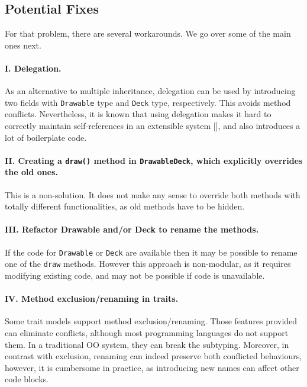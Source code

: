 \subsection{Potential Fixes}

For that problem, there are several workarounds. We go over some of
the main ones next.

\paragraph{I. Delegation.} As an alternative to multiple inheritance,
delegation can be used by introducing two fields with
\lstinline|Drawable| type and \lstinline|Deck| type,
respectively. This avoids method conflicts. Nevertheless, it is known
that using delegation makes it hard to correctly maintain
self-references  in an extensible system [], and also
introduces a lot of boilerplate code.

\paragraph{II. Creating a \lstinline|draw()| method in \lstinline|DrawableDeck|, which explicitly overrides the old ones.}
This is a non-solution. It does not make any sense to override both methods with totally different functionalities, as old
methods have to be hidden.

\paragraph{III. Refactor Drawable and/or Deck to rename the methods.} If
the code for \lstinline|Drawable| or \lstinline|Deck| are available
then it may be possible to rename one of the \lstinline|draw|
methods. However this approach is non-modular, as it requires 
modifying existing code, and may not be possible if code is unavailable.


\paragraph{IV. Method exclusion/renaming in traits.} Some trait models
support method exclusion/renaming. Those features
provided can eliminate conflicts, although most
programming languages do not support them. In a traditional OO system,
they can break the subtyping. Moreover, in
contrast with exclusion, renaming can indeed preserve both conflicted
behaviours, however, it is cumbersome in practice, as introducing new
names can affect other code blocks. \\

